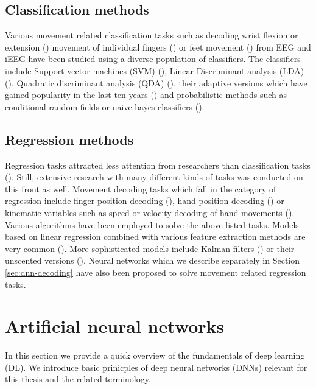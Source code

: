 \subsection{Classification methods}
Various movement related classification tasks such as decoding wrist flexion or extension (\cite{wrist-flexion}) movement of individual fingers (\cite{cond-rf-finger-class, lda-finger-movement-classification}) or feet movement (\cite{feet-movement}) from EEG and iEEG have been studied using a diverse population of classifiers.  
The classifiers include Support vector machines (SVM) (\cite{svm-alg}), Linear Discriminant analysis (LDA) (\cite{lda-paper}), Quadratic discriminant analysis (QDA) (\cite{qda-paper}), their adaptive versions which have gained popularity in the last ten years (\cite{lotte2018review}) and probabilistic methods such as conditional random fields or naive bayes classifiers (\cite{bayesian-decoding, cond-rf-finger-class}). 


\subsection{Regression methods}
Regression tasks attracted less attention from researchers than classification tasks (\cite{volkova-review}).
Still, extensive research with many different kinds of tasks was conducted on this front as well.
Movement decoding tasks which fall in the category of regression include finger position decoding (\cite{Pistohl2008PredictionOA}), hand position decoding (\cite{ball-2019}) or
kinematic variables such as speed or velocity decoding of hand movements (\cite{hammer-role-2013, hammer-predominance-2016, Hammer-2021, kalman-filters-velocity, linear-regression-eeg-hand-3d}).
Various algorithms have been employed to solve the above listed tasks. 
Models based on linear regression combined with various feature extraction methods are very common (\cite{hammer-role-2013, hammer-predominance-2016, eeg-hand-moving, linear-regression-eeg-hand-3d}).
More sophisticated models include Kalman filters (\cite{kalman-filters-velocity}) or their unscented versions (\cite{uns-kalman-filters-gait-decoding}).
Neural networks which we describe separately in Section \ref{sec:dnn-decoding} have also been proposed to solve movement related regression tasks.


\section{Artificial neural networks}
In this section we provide a quick overview of the fundamentals of deep learning (DL). 
We introduce basic prinicples of deep neural networks (DNNs) relevant for this thesis and the related terminology.

